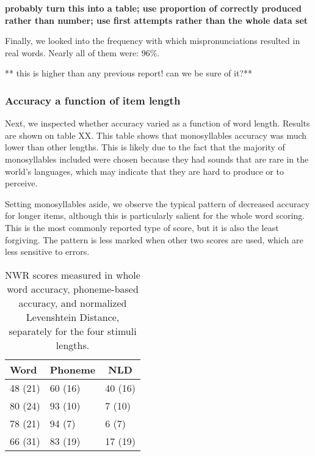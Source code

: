 \documentclass[english,,man,floatsintext]{apa6}
\begin{document}
\textbf{probably turn this into a table; use proportion of correctly produced rather than number; use first attempts rather than the whole data set}

Finally, we looked into the frequency with which mispronunciations resulted in real words. Nearly all of them were: 96\%.

** this is higher than any previous report! can we be sure of it?**

\hypertarget{accuracy-a-function-of-item-length}{%
\subsubsection{Accuracy a function of item length}\label{accuracy-a-function-of-item-length}}

Next, we inspected whether accuracy varied as a function of word length. Results are shown on table XX. This table shows that monosyllables accuracy was much lower than other lengths. This is likely due to the fact that the majority of monosyllables included were chosen because they had sounds that are rare in the world's languages, which may indicate that they are hard to produce or to perceive.

Setting monosyllables aside, we observe the typical pattern of decreased accuracy for longer items, although this is particularly salient for the whole word scoring. This is the most commonly reported type of score, but it is also the least forgiving. The pattern is less marked when other two scores are used, which are less sensitive to errors.

\begin{table}[tbp]

\begin{center}
\begin{threeparttable}

\caption{\label{tab:tablength}NWR scores measured in whole word accuracy, phoneme-based accuracy, and normalized Levenshtein Distance, separately for the four stimuli lengths.}

\begin{tabular}{lll}
\toprule
Word & \multicolumn{1}{c}{Phoneme} & \multicolumn{1}{c}{NLD}\\
\midrule
48 (21) & 60 (16) & 40 (16)\\
80 (24) & 93 (10) & 7 (10)\\
78 (21) & 94 (7) & 6 (7)\\
66 (31) & 83 (19) & 17 (19)\\
\bottomrule
\end{tabular}

\end{threeparttable}
\end{center}

\end{table}
\end{document}
